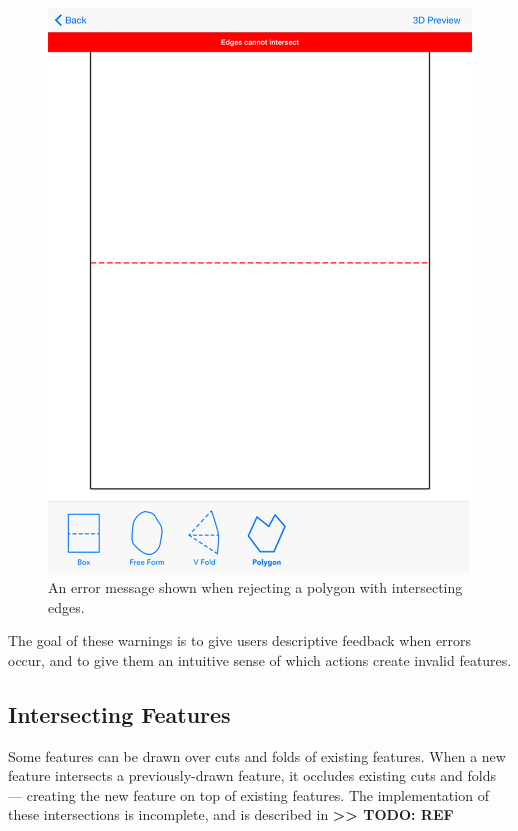 \begin{figure}[htbp]
\centering
\includegraphics{figures/32_UI_Tool_Interactions/error_message.png}
\caption{An error message shown when rejecting a polygon with
intersecting edges.}
\end{figure}

The goal of these warnings is to give users descriptive feedback when
errors occur, and to give them an intuitive sense of which actions
create invalid features.

\subsection{Intersecting Features}\label{intersecting-features}

Some features can be drawn over cuts and folds of existing features.
When a new feature intersects a previously-drawn feature, it occludes
existing cuts and folds --- creating the new feature on top of existing
features. The implementation of these intersections is incomplete, and
is described in \textbf{\textgreater{}\textgreater{} TODO: REF}

